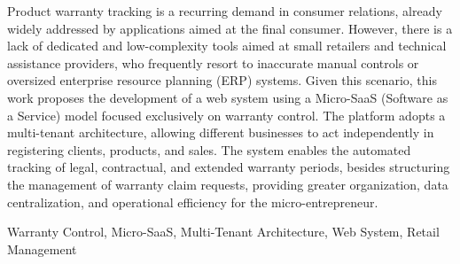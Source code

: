 Product warranty tracking is a recurring demand in consumer relations, already widely addressed by applications aimed at the final consumer. However, there is a lack of dedicated and low-complexity tools aimed at small retailers and technical assistance providers, who frequently resort to inaccurate manual controls or oversized enterprise resource planning (ERP) systems. Given this scenario, this work proposes the development of a web system using a Micro-SaaS (Software as a Service) model focused exclusively on warranty control. The platform adopts a multi-tenant architecture, allowing different businesses to act independently in registering clients, products, and sales. The system enables the automated tracking of legal, contractual, and extended warranty periods, besides structuring the management of warranty claim requests, providing greater organization, data centralization, and operational efficiency for the micro-entrepreneur.

\begin{keywords}
Warranty Control, Micro-SaaS, Multi-Tenant Architecture, Web System, Retail Management
\end{keywords}